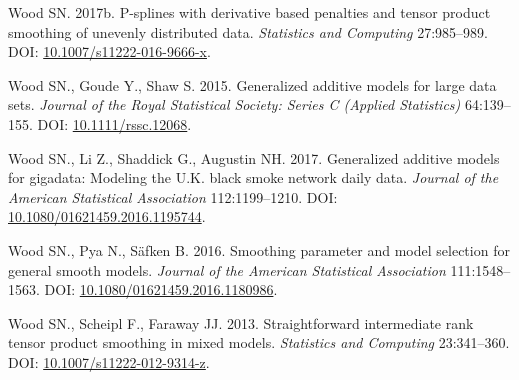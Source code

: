 \documentclass[12pt]{article}
\begin{document}
\hypertarget{ref-wood_p_splines_2017}{}
Wood SN. 2017b. P-splines with derivative based penalties and tensor
product smoothing of unevenly distributed data. \emph{Statistics and
Computing} 27:985--989. DOI:
\href{https://doi.org/10.1007/s11222-016-9666-x}{10.1007/s11222-016-9666-x}.

\hypertarget{ref-wood_generalized_2015}{}
Wood SN., Goude Y., Shaw S. 2015. Generalized additive models for large
data sets. \emph{Journal of the Royal Statistical Society: Series C
(Applied Statistics)} 64:139--155. DOI:
\href{https://doi.org/10.1111/rssc.12068}{10.1111/rssc.12068}.

\hypertarget{ref-Wood2017-iy}{}
Wood SN., Li Z., Shaddick G., Augustin NH. 2017. Generalized additive
models for gigadata: Modeling the U.K. black smoke network daily data.
\emph{Journal of the American Statistical Association} 112:1199--1210.
DOI:
\href{https://doi.org/10.1080/01621459.2016.1195744}{10.1080/01621459.2016.1195744}.

\hypertarget{ref-wood_smoothing_2016}{}
Wood SN., Pya N., Säfken B. 2016. Smoothing parameter and model
selection for general smooth models. \emph{Journal of the American
Statistical Association} 111:1548--1563. DOI:
\href{https://doi.org/10.1080/01621459.2016.1180986}{10.1080/01621459.2016.1180986}.

\hypertarget{ref-wood_straightforward_2012}{}
Wood SN., Scheipl F., Faraway JJ. 2013. Straightforward intermediate
rank tensor product smoothing in mixed models. \emph{Statistics and
Computing} 23:341--360. DOI:
\href{https://doi.org/10.1007/s11222-012-9314-z}{10.1007/s11222-012-9314-z}.
\end{document}
